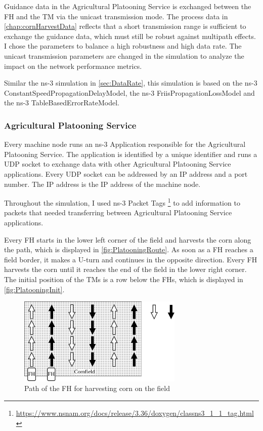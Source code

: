 Guidance data in the Agricultural Platooning Service is exchanged between the \ac{FH} and the \ac{TM} via the
unicast transmission mode.
The process data in \autoref{chap:cornHarvestData} reflects that a short transmission range
is sufficient to exchange the guidance data, which must still be robust against multipath effects.
I chose the parameters to balance a high robustness and high data rate.
The unicast transmission parameters are changed in the simulation to analyze the impact on the network performance metrics.

Similar the ns-3 simulation in \autoref{sec:DataRate}, this simulation is based on the ns-3 ConstantSpeedPropagationDelayModel, the ns-3 FriisPropagationLossModel and
the ns-3 TableBasedErrorRateModel.


\subsubsection*{Agricultural Platooning Service}
Every machine node runs an ns-3 Application responsible for the Agricultural Platooning Service.
The application is identified by a unique identifier and runs a \ac{UDP} socket to exchange data with other Agricultural Platooning Service applications.
Every \ac{UDP} socket can be addressed by an IP address and a port number.
The IP address is the IP address of the machine node.

Throughout the simulation, I used ns-3 Packet Tags \footnote{\url{https://www.nsnam.org/docs/release/3.36/doxygen/classns3_1_1_tag.html}} to add information to packets that needed transferring between Agricultural Platooning Service applications.

Every \ac{FH} starts in the lower left corner of the field and harvests the corn along the path,
which is displayed in \autoref{fig:PlatooningRoute}.
As soon as a \ac{FH} reaches a field border, it makes a U-turn and continues
in the opposite direction.
Every \ac{FH} harvests the corn until it reaches the end of the field in the lower right corner.
The initial position of the \acp{TM} is a row below the \acp{FH}, which is displayed in \autoref{fig:PlatooningInit}.
\begin{figure}[H]%
   \centering
   \includegraphics[width=0.7\textwidth]{Latex/figures/drawings-Route}
   \caption{Path of the \acf{FH} for harvesting corn on the field}
   \label{fig:PlatooningRoute}%
\end{figure}

